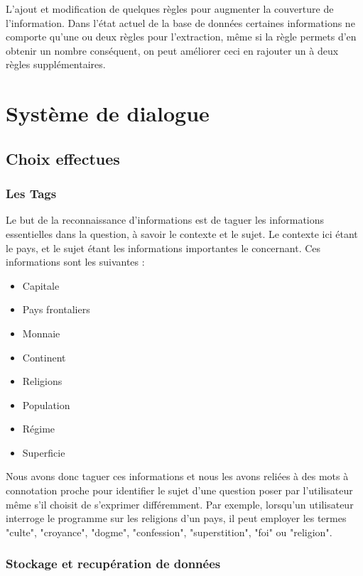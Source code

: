 \documentclass[11pt,a4paper]{article}
\begin{document}
L'ajout et modification de quelques règles pour augmenter la couverture de l'information. Dans l'état actuel de la base de données certaines informations ne comporte qu'une ou deux règles pour l'extraction, même si la règle permets d'en obtenir un nombre conséquent, on peut améliorer ceci en rajouter un à deux règles supplémentaires.

\clearpage

\section{Système de dialogue}

\subsection{Choix effectues}

\subsubsection{Les Tags} 

Le but de la reconnaissance d’informations est de taguer les informations essentielles dans la question, à savoir le contexte et le sujet. Le contexte ici étant le pays, et le sujet étant les informations importantes le concernant. Ces informations sont les suivantes :
\begin{itemize}
	\item Capitale
	\item Pays frontaliers
	\item Monnaie
	\item Continent
	\item Religions
	\item Population
	\item Régime
	\item Superficie
\end{itemize}

Nous avons donc taguer ces informations et nous les avons reliées à des mots à connotation proche pour identifier le sujet d'une question poser par l'utilisateur même s'il choisit de s'exprimer différemment. Par exemple, lorsqu'un utilisateur interroge le programme sur les religions d'un pays, il peut employer les termes "culte", "croyance", "dogme", "confession", "superstition", "foi" ou "religion".

\subsubsection{Stockage et recupération de données}
\end{document}
